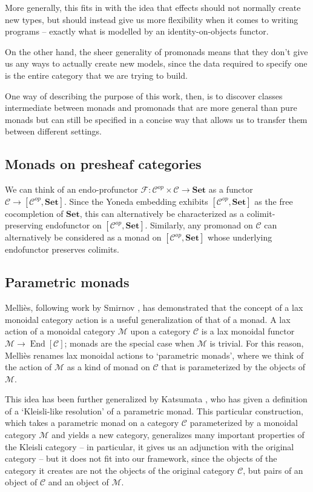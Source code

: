\documentclass{svproc}
\newcommand\C{\mathcal{C}}
\newcommand\F{\mathcal{F}}
\newcommand\M{\mathcal{M}}
\DeclareMathOperator{\End}{End}
\newcommand\Mellies{Melli\`{e}s\xspace}
\newcommand*\from{\colon}
\newcommand{\0}{{\mathtt{0}}} \newcommand{\com}{{\mathtt{com}}}
\newcommand{\catname}[1]{\mathbf{#1}}
\newcommand{\Set}{\catname{Set}}
\begin{document}
More generally, this fits in with the idea that effects should not normally create new types, but should instead give us more flexibility when it comes to writing programs -- exactly what is modelled by an identity-on-objects functor.

On the other hand, the sheer generality of promonads means that they don't give us any ways to actually create new models, since the data required to specify one is the entire category that we are trying to build.

One way of describing the purpose of this work, then, is to discover classes intermediate between monads and promonads that are more general than pure monads but can still be specified in a concise way that allows us to transfer them between different settings.

\subsection{Monads on presheaf categories}

We can think of an endo-profunctor $\F\from \C^{op}\times\C\to \Set$ as a functor $\C\to [\C^{op},\Set]$.  
Since the Yoneda embedding exhibits $[\C^{op},\Set]$ as the free cocompletion of $\Set$, this can alternatively be characterized as a colimit-preserving endofunctor on $[\C^{op},\Set]$.  
Similarly, any promonad on $\C$ can alternatively be considered as a monad on $[\C^{op},\Set]$ whose underlying endofunctor preserves colimits.

\subsection{Parametric monads}

\Mellies \cite{ParametricMonads}, following work by Smirnov \cite{Smirnov2008}, has demonstrated that the concept of a lax monoidal category action is a useful generalization of that of a monad.  
A lax action of a monoidal category $\M$ upon a category $\C$ is a lax monoidal functor $\M\to \End[\C]$; monads are the special case when $\M$ is trivial.  
For this reason, \Mellies renames lax monoidal actions to `parametric monads', where we think of the action of $\M$ as a kind of monad on $\C$ that is parameterized by the objects of $\M$.

This idea has been further generalized by Katsumata \cite{Katsu}, who has given a definition of a `Kleisli-like resolution' of a parametric monad.  
This particular construction, which takes a parametric monad on a category $\C$ parameterized by a monoidal category $\M$ and yields a new category, generalizes many important properties of the Kleisli category -- in particular, it gives us an adjunction with the original category -- but it does not fit into our framework, since the objects of the category it creates are not the objects of the original category $\C$, but pairs of an object of $\C$ and an object of $\M$.
\end{document}
